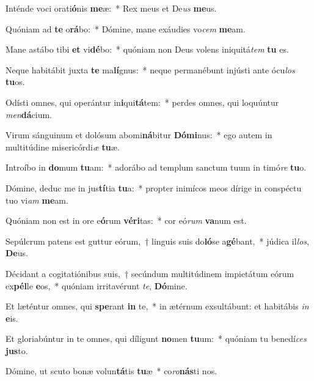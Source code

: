 \item Inténde voci orati\textbf{ó}nis \textbf{me}æ:~* Rex meus et De\textit{us} \textbf{me}us.
\item Quóniam ad \textbf{te} o\textbf{rá}bo:~* Dómine, mane exáudies vo\textit{cem} \textbf{me}am.
\item Mane astábo tibi \textbf{et} vi\textbf{dé}bo:~* quóniam non Deus volens iniquitá\textit{tem} \textbf{tu} es.
\item Neque habitábit juxta \textbf{te} ma\textbf{lí}gnus:~* neque permanébunt injústi ante ócu\textit{los} \textbf{tu}os.
\item Odísti omnes, qui operántur in\textbf{i}qui\textbf{tá}tem:~* perdes omnes, qui loquúntur \textit{men}\textbf{dá}cium.
\item Virum sánguinum et dolósum abomi\textbf{ná}bitur \textbf{Dó}\textbf{mi}nus:~* ego autem in multitúdine misericórdi\textit{æ} \textbf{tu}æ.
\item Introíbo in \textbf{do}mum \textbf{tu}am:~* adorábo ad templum sanctum tuum in timó\textit{re} \textbf{tu}o.
\item Dómine, deduc me in jus\textbf{tí}tia \textbf{tu}a:~* propter inimícos meos dírige in conspéctu tuo vi\textit{am} \textbf{me}am.
\item Quóniam non est in ore e\textbf{ó}rum \textbf{vé}\textbf{ri}tas:~* cor eó\textit{rum} \textbf{va}num est.
\item Sepúlcrum patens est guttur eórum,~† linguis suis do\textbf{ló}se a\textbf{gé}bant,~* júdica il\textit{los}, \textbf{De}us.
\item Décidant a cogitatiónibus suis,~† secúndum multitúdinem impietátum eórum ex\textbf{pél}le \textbf{e}os,~* quóniam irritavérunt \textit{te}, \textbf{Dó}mine.
\item Et læténtur omnes, qui \textbf{spe}rant \textbf{in} te,~* in ætérnum exsultábunt: et habitábis \textit{in} \textbf{e}is.
\item Et gloriabúntur in te omnes, qui díligunt \textbf{no}men \textbf{tu}um:~* quóniam tu benedí\textit{ces} \textbf{jus}to.
\item Dómine, ut scuto bonæ volun\textbf{tá}tis \textbf{tu}æ~* co\textit{ro}\textbf{nás}ti nos.
